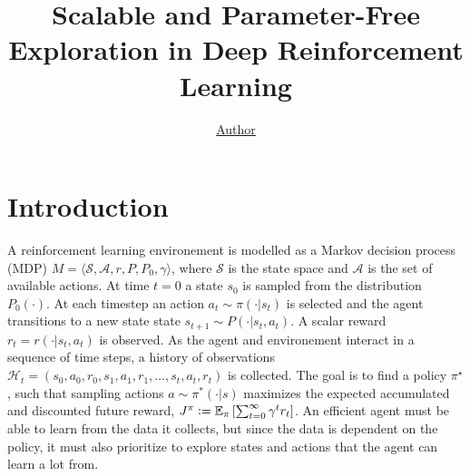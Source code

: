 \documentclass[]{uai2021} %
\title{Scalable and Parameter-Free Exploration in Deep Reinforcement Learning}
\author[1]{\href{mailto:<jj@example.edu>?Subject=LALAL}{Author}{}}
\newcommand{\defeq}{\vcentcolon=}
\newcommand{\E}{\mathbb{E}}
\newcommand{\state}{\mathcal{S}}
\newcommand{\action}{\mathcal{A}}
\begin{document}
\maketitle

\begin{abstract}
\end{abstract}


\section{Introduction}
A reinforcement learning environement is modelled as a Markov decision process (MDP)
\(M = \langle \state, \action, r, P, P_0, \gamma \rangle\), where \(\state\) is the
state space and \(\action\) is the set of available actions. At time \(t=0\) a state
\(s_0\) is sampled from the distribution \(P_0(\cdot)\). At each timestep an action
\(a_t \sim \pi(\cdot \vert s_t)\) is selected and the agent transitions to a new state
state \(s_{t+1} \sim P(\cdot \vert s_t, a_t)\). A scalar reward
\(r_t = r(\cdot \vert s_t, a_t)\) is observed. As the agent and environement
interact in a sequence of time steps, a history of observations
\(\mathcal{H}_t = (s_0, a_0, r_0, s_1, a_1, r_1, \dots, s_t, a_t, r_t)\) is collected.
The goal is to find a policy \(\pi^\star\), such that sampling actions
\(a \sim \pi^*(\cdot \vert s)\) maximizes the expected accumulated and discounted future reward,
\(J^\pi \defeq \E_\pi \left[ \sum_{t=0}^\infty \gamma^t r_t \right]\). An efficient
agent must be able to learn from the data it collects, but since the data is
dependent on the policy, it must also prioritize to explore states and actions that
the agent can learn a lot from.
\end{document}
